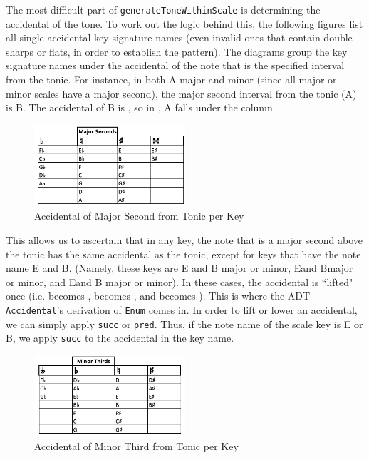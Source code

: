 \documentclass{report}
\begin{document}
The most difficult part of \verb.generateToneWithinScale. is determining the accidental of the tone. To work out the logic behind this, the following figures list all single-accidental key signature names (even invalid ones that contain double sharps or flats, in order to establish the pattern). The diagrams group the key signature names under the accidental of the note that is the specified interval from the tonic. For instance, in both A\musFlat\; major and minor (since all major or minor scales have a major second), the major second interval from the tonic (A\musFlat) is B\musFlat. The accidental of B\musFlat\; is \musFlat, so in , A\musFlat\; falls under the \musFlat\; column.

\begin{figure}[h!]
\centering
\includegraphics[width=0.5\textwidth]{images/maj_seconds}
\caption{Accidental of Major Second from Tonic per Key}
\label{maj_seconds}
\end{figure}

This allows us to ascertain that in any key, the note that is a major second above the tonic has the same accidental as the tonic, except for keys that have the note name E and B. (Namely, these keys are E and B major or minor, E\musFlat and B\musFlat major or minor, and E\musSharp and B \musSharp major or minor). In these  cases, the accidental is ``lifted" once  (i.e. \musFlat becomes \musNatural, \musNatural becomes \musSharp, and \musSharp becomes \musDoubleSharp). This is where the ADT \verb.Accidental.'s derivation of \verb.Enum. comes in. In order to lift or lower an accidental, we can simply apply \verb.succ. or \verb.pred.. Thus, if the note name of the scale key is E or B, we apply \verb.succ. to the accidental in the key name. 

\begin{figure}[h!]
\centering
\includegraphics[width=0.5\textwidth]{images/min_thirds}
\caption{Accidental of Minor Third from Tonic per Key}
\label{min_thirds}
\end{figure}
\end{document}
